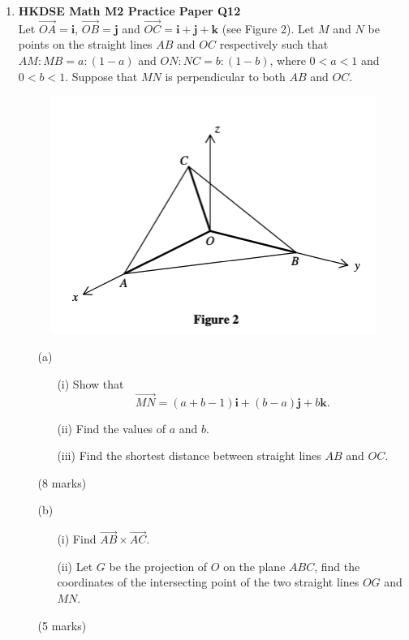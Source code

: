 \documentclass{report}
\begin{document}
\begin{enumerate}
	\item \textbf{HKDSE Math M2 Practice Paper Q12}\\
	Let $\overrightarrow{OA} = \textbf{i}$, $\overrightarrow{OB} = \textbf{j}$ and $\overrightarrow{OC} = \textbf{i} + \textbf{j} + \textbf{k}$ (see Figure 2). Let $M$ and $N$ be points on the straight lines $AB$ and $OC$ respectively such that $AM:MB = a:(1-a)$ and $ON:NC = b:(1-b)$, where $0 < a < 1$ and $0 < b < 1$. Suppose that $MN$ is perpendicular to both $AB$ and $OC$.
	\begin{figure}[H]
		\centering
		\includegraphics[width = .5\linewidth]{PPFigure2}
	\end{figure}
	\begin{enumerate}
		\item [(a)]
		\begin{enumerate}
			\item [(i)]Show that $$\overrightarrow{MN} = (a+b-1)\textbf{i} +(b-a) \textbf{j} +b \textbf{k}.$$
			\item [(ii)]Find the values of $a$ and $b$.
			\item [(iii)]Find the shortest distance between straight lines $AB$ and $OC$.
		\end{enumerate}
		(8 marks)
		\item [(b)]
		\begin{enumerate}
			\item [(i)]Find $\overrightarrow{AB}\times\overrightarrow{AC}$. 
			\item [(ii)]Let $G$ be the projection of $O$ on the plane $ABC$, find the coordinates of the intersecting point of the two straight lines $OG$ and $MN$.
		\end{enumerate}
		(5 marks)    
  	\end{enumerate}
	
	\newpage
	

\end{enumerate}
\end{document}
